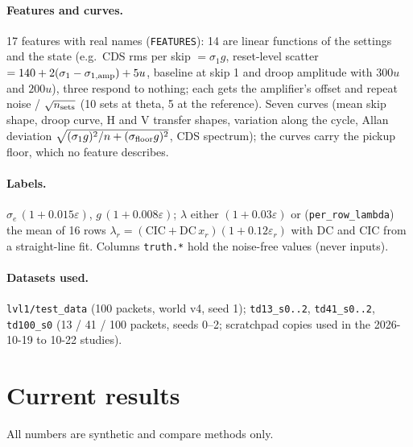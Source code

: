 \documentclass[10pt]{article}
\newcommand{\code}[1]{\texttt{#1}}
\newcommand{\se}{\sigma_e}
\begin{document}
\paragraph{Features and curves.} 17 features with real names (\code{FEATURES}): 14 are linear functions of the settings
and the state (e.g.\ CDS rms per skip $= \sigma_1 g$, reset-level scatter $= 140 + 2(\sigma_1 - \sigma_{1,\rm amp}) + 5u$,
baseline at skip 1 and droop amplitude with $300u$ and $200u$), three respond to nothing; each gets the amplifier's
offset and repeat noise / $\sqrt{n_{\rm sets}}$ (10 sets at theta, 5 at the reference). Seven curves (mean skip shape,
droop curve, H and V transfer shapes, variation along the cycle, Allan deviation $\sqrt{(\sigma_1 g)^2/n + (\sigma_{\rm
floor}g)^2}$, CDS spectrum); the curves carry the pickup floor, which no feature describes.

\paragraph{Labels.} $\se\,(1 + 0.015\varepsilon)$, $g\,(1 + 0.008\varepsilon)$; $\lambda$ either $(1 + 0.03\varepsilon)$
or (\code{per\_row\_lambda}) the mean of 16 rows $\lambda_r = (\mathrm{CIC} + \mathrm{DC}\,x_r)(1 + 0.12\varepsilon_r)$
with DC and CIC from a straight-line fit. Columns \code{truth.*} hold the noise-free values (never inputs).

\paragraph{Datasets used.} \code{lvl1/test\_data} (100 packets, world v4, seed 1); \code{td13\_s0..2}, \code{td41\_s0..2},
\code{td100\_s0} (13 / 41 / 100 packets, seeds 0--2; scratchpad copies used in the 2026-10-19 to 10-22 studies).

\section{Current results}
\label{sec:results}

All numbers are synthetic and compare methods only.
\end{document}

